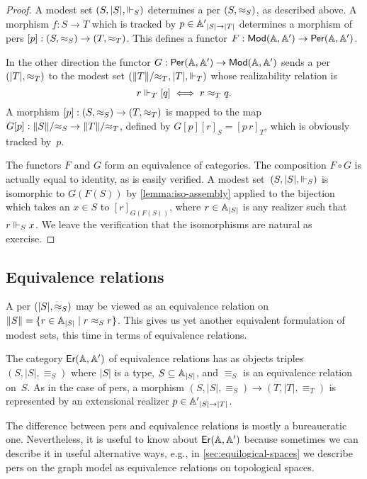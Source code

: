 \begin{proof}
  A modest set $(S, |S|, {\Vdash_{S}})$ determines a per $(S, {\approx_S})$,
  as described above. A morphism $f : S \to T$ which is tracked by $p
  \in {\mathbb{A}'}_{|S| \to |T|}$ determines a morphism of pers $[p] : (S,
  {\approx_S}) \to (T, {\approx_T})$. This defines a functor $F : \mathsf{Mod}(\mathbb{A},
    \mathbb{A}') \to \mathsf{Per}(\mathbb{A}, \mathbb{A}')$.

  In the other direction the functor $G : \mathsf{Per}(\mathbb{A}, \mathbb{A}') \to
  \mathsf{Mod}(\mathbb{A}, \mathbb{A}')$ sends a per $(|T|, {\approx_T})$ to the modest set
  $(\|T\|/{\approx_T}, |T|, {\Vdash_T})$ whose realizability relation is
  \begin{equation*}
    r \Vdash_T [q] \iff r \approx_T q.
  \end{equation*}
  A morphism $[p] : (S, {\approx_S}) \to (T, {\approx_T})$ is mapped to the
  map $G [p] : \|S\|/{\approx_S} \to \|T\|/{\approx_T}$, defined by $G [p]
  [r]_S = [p\,r]_T$, which is obviously tracked by~$p$.

  The functors $F$ and $G$ form an equivalence of categories. The
  composition $F \circ G$ is actually equal to identity, as is easily
  verified. A modest set~$(S, |S|, {\Vdash_{S}})$ is isomorphic to
  $G(F(S))$ by \cref{lemma:iso-assembly} applied to the bijection
  which takes an $x \in S$ to $[r]_{G(F(S))}$, where $r \in {\mathbb{A}}_{|S|}$
  is any realizer such that $r \Vdash_S x$. We leave the verification
  that the isomorphisms are natural as exercise.
\end{proof}


\subsection{Equivalence relations}
\label{sec:ers}

A per $(|S|, {\approx_S})$ may be viewed as an equivalence relation on
$\|S\| = \{r \in {\mathbb{A}}_{|S|} \mid r \approx_S r\}$. This gives us yet
another equivalent formulation of modest sets, this time in terms of
equivalence relations.

The category $\mathsf{Er}(\mathbb{A}, \mathbb{A}')$ of equivalence relations has as objects triples $(S, |S|, {\equiv_S})$ where $|S|$ is a
type, $S \subseteq {\mathbb{A}}_{|S|}$, and $\equiv_S$ is an equivalence relation on~$S$. As in the case of pers, a morphism
$(S, |S|, {\equiv_S}) \to (T, |T|, {\equiv_T})$ is represented by an extensional realizer
$p \in {\mathbb{A}'}_{|S| \to |T|}$.

The difference between pers and equivalence relations is mostly a
bureaucratic one. Nevertheless, it is useful to know about $\mathsf{Er}(\mathbb{A},
  \mathbb{A}')$ because sometimes we can describe it in useful
alternative ways, e.g., in \cref{sec:equilogical-spaces} we
describe pers on the graph model as equivalence relations on
topological spaces.

